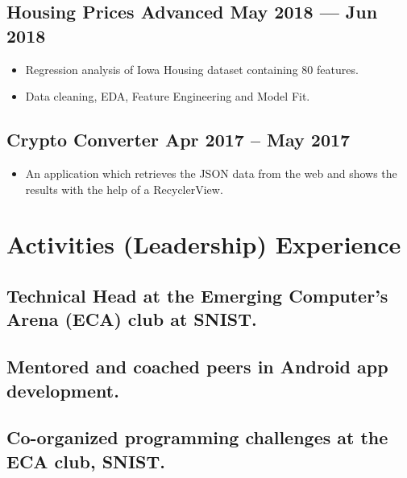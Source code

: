 \documentclass[a4,10pt]{article}
\newenvironment{zitemize}{
\begin{itemize}\itemsep0pt \parskip0pt \parsep1pt}
{\end{itemize}\vspace{-0.5cm}}
\begin{document}
\subsection*{Housing Prices Advanced \hfill May 2018 --- Jun 2018} 
    \begin{zitemize}
        \item Regression analysis of Iowa Housing dataset containing 80 features. 
        \item Data cleaning, EDA, Feature Engineering and Model Fit. 
    \end{zitemize}


\subsection*{Crypto Converter \hfill Apr 2017 – May 2017} 
    \begin{zitemize}
        \item An application which retrieves the JSON data from the web and shows the results with the help of a RecyclerView.
    \end{zitemize}



\section{Activities (Leadership) Experience}

\subsection*{Technical Head {\normalsize \normalfont at the Emerging Computer’s Arena (ECA) club at SNIST.}} 
\vspace{0.1cm}
\subsection*{Mentored and coached {\normalsize \normalfont peers in Android app development.}} 
\vspace{0.1cm}
\subsection*{Co-organized {\normalsize \normalfont programming challenges at the ECA club, SNIST.}} 



\end{document}
